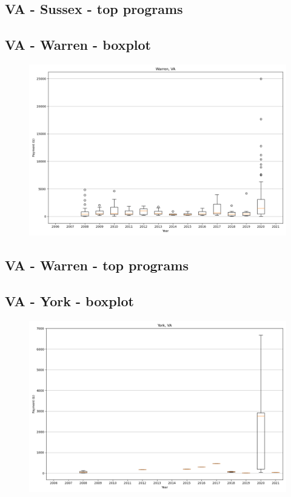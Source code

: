 \subsection*{VA - Sussex - top programs}

\newpage
\subsection*{VA - Warren - boxplot}
\begin{figure}[h]
\centering
\includegraphics[width=7in]{../output/boxplots/counties/Warren-VA_boxplot.png}
\end{figure}


\subsection*{VA - Warren - top programs}

\newpage
\subsection*{VA - York - boxplot}
\begin{figure}[h]
\centering
\includegraphics[width=7in]{../output/boxplots/counties/York-VA_boxplot.png}
\end{figure}


